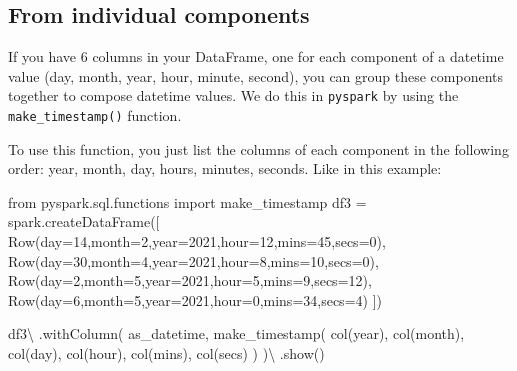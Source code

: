 \documentclass[
  11pt,
  letterpaper,
  DIV=11,
  numbers=noendperiod]{scrreprt}
\newenvironment{Shaded}{\begin{snugshade}}{\end{snugshade}}
\newcommand{\DecValTok}[1]{\textcolor[rgb]{0.68,0.00,0.00}{#1}}
\newcommand{\ImportTok}[1]{\textcolor[rgb]{0.00,0.46,0.62}{#1}}
\newcommand{\NormalTok}[1]{\textcolor[rgb]{0.00,0.23,0.31}{#1}}
\newcommand{\OperatorTok}[1]{\textcolor[rgb]{0.37,0.37,0.37}{#1}}
\newcommand{\StringTok}[1]{\textcolor[rgb]{0.13,0.47,0.30}{#1}}
\begin{document}
\subsection{From individual
components}\label{from-individual-components-1}

If you have 6 columns in your DataFrame, one for each component of a
datetime value (day, month, year, hour, minute, second), you can group
these components together to compose datetime values. We do this in
\texttt{pyspark} by using the \texttt{make\_timestamp()} function.

To use this function, you just list the columns of each component in the
following order: year, month, day, hours, minutes, seconds. Like in this
example:

\begin{Shaded}
\begin{Highlighting}[]
\ImportTok{from}\NormalTok{ pyspark.sql.functions }\ImportTok{import}\NormalTok{ make\_timestamp}
\NormalTok{df3 }\OperatorTok{=}\NormalTok{ spark.createDataFrame([}
\NormalTok{    Row(day}\OperatorTok{=}\DecValTok{14}\NormalTok{,month}\OperatorTok{=}\DecValTok{2}\NormalTok{,year}\OperatorTok{=}\DecValTok{2021}\NormalTok{,hour}\OperatorTok{=}\DecValTok{12}\NormalTok{,mins}\OperatorTok{=}\DecValTok{45}\NormalTok{,secs}\OperatorTok{=}\DecValTok{0}\NormalTok{),}
\NormalTok{    Row(day}\OperatorTok{=}\DecValTok{30}\NormalTok{,month}\OperatorTok{=}\DecValTok{4}\NormalTok{,year}\OperatorTok{=}\DecValTok{2021}\NormalTok{,hour}\OperatorTok{=}\DecValTok{8}\NormalTok{,mins}\OperatorTok{=}\DecValTok{10}\NormalTok{,secs}\OperatorTok{=}\DecValTok{0}\NormalTok{),}
\NormalTok{    Row(day}\OperatorTok{=}\DecValTok{2}\NormalTok{,month}\OperatorTok{=}\DecValTok{5}\NormalTok{,year}\OperatorTok{=}\DecValTok{2021}\NormalTok{,hour}\OperatorTok{=}\DecValTok{5}\NormalTok{,mins}\OperatorTok{=}\DecValTok{9}\NormalTok{,secs}\OperatorTok{=}\DecValTok{12}\NormalTok{),}
\NormalTok{    Row(day}\OperatorTok{=}\DecValTok{6}\NormalTok{,month}\OperatorTok{=}\DecValTok{5}\NormalTok{,year}\OperatorTok{=}\DecValTok{2021}\NormalTok{,hour}\OperatorTok{=}\DecValTok{0}\NormalTok{,mins}\OperatorTok{=}\DecValTok{34}\NormalTok{,secs}\OperatorTok{=}\DecValTok{4}\NormalTok{)}
\NormalTok{])}

\NormalTok{df3}\OperatorTok{\textbackslash{}}
\NormalTok{    .withColumn(}
        \StringTok{\textquotesingle{}as\_datetime\textquotesingle{}}\NormalTok{,}
\NormalTok{        make\_timestamp(}
\NormalTok{            col(}\StringTok{\textquotesingle{}year\textquotesingle{}}\NormalTok{),}
\NormalTok{            col(}\StringTok{\textquotesingle{}month\textquotesingle{}}\NormalTok{),}
\NormalTok{            col(}\StringTok{\textquotesingle{}day\textquotesingle{}}\NormalTok{),}
\NormalTok{            col(}\StringTok{\textquotesingle{}hour\textquotesingle{}}\NormalTok{),}
\NormalTok{            col(}\StringTok{\textquotesingle{}mins\textquotesingle{}}\NormalTok{),}
\NormalTok{            col(}\StringTok{\textquotesingle{}secs\textquotesingle{}}\NormalTok{)}
\NormalTok{        )}
\NormalTok{    )}\OperatorTok{\textbackslash{}}
\NormalTok{    .show()}
\end{Highlighting}
\end{Shaded}
\end{document}
